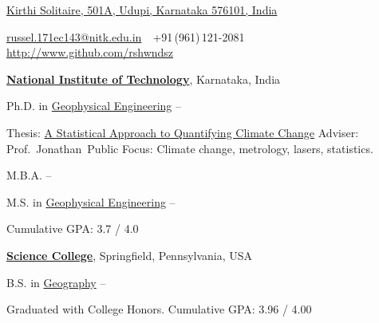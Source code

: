 \documentclass[letterpaper,MMMyyyy,nonstopmode]{simpleresumecv}
\newcommand{\CVAuthor}{Russel Dsouza}
\newcommand{\CVWebpage}{http://www.github.com/rshwndsz}
\begin{document}

\Title{\CVAuthor}

\begin{SubTitle}
  \href{https://www.google.com/maps/place/Kirthi+Solitaire/@13.3413078,74.7361138,17z/data=!3m1!4b1!4m5!3m4!1s0x3bbcbb775f6fbac5:0x1dd5518cadafdd1a!8m2!3d13.3413078!4d74.7383025}
  {Kirthi Solitaire, 501A, Udupi, Karnataka 576101, India}
  \par
  \href{mailto:russel.171ec143@nitk.edu.in}
  {russel.171ec143@nitk.edu.in}
  \,\SubBulletSymbol\,
  +91\,(961)\,121-2081
  \,\SubBulletSymbol\,
  \href{\CVWebpage}
  {\url{\CVWebpage}}
\end{SubTitle}

\begin{Body}



  \Entry
  \href{http://www.nitk.ac.in}
  {\textbf{National Institute of Technology}},
  Karnataka, India

  \Gap
    \BulletItem
      Ph.D. in
      \href{http://www.example.com/my-department}
      {Geophysical Engineering}
      \hfill
       --
      \begin{Detail}
        \SubBulletItem
          Thesis:
          \href{http://www.example.com/my-phd-thesis}
          {A Statistical Approach to Quantifying Climate Change}
        \SubBulletItem
          Adviser:
          Prof.~Jonathan~Public
        \SubBulletItem
          Focus:
          Climate change, metrology, lasers, statistics.
    \end{Detail}

  \Gap
    \BulletItem
    M.B.A.
    \hfill
     --

  \Gap
    \BulletItem
    M.S. in
    \href{http://www.example.com/my-department}
    {Geophysical Engineering}
    \hfill
     --
    \begin{Detail}
      \SubBulletItem
        Cumulative GPA: 3.7 / 4.0
    \end{Detail}

  \BigGap
    \Entry
    \href{http://www.example.com/my-college}
    {\textbf{Science College}},
    Springfield, Pennsylvania, USA

  \Gap
    \BulletItem
    B.S. in
    \href{http://www.example.com/my-department}
    {Geography}
    \hfill
     --
    \begin{Detail}
      \SubBulletItem
        Graduated with College Honors.
      \SubBulletItem
        Cumulative GPA: 3.96 / 4.00
    \end{Detail}


\end{Body}
\end{document}
